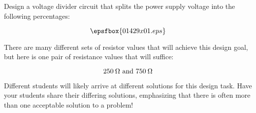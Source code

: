 

Design a voltage divider circuit that splits the power supply voltage into the following percentages:

$$\epsfbox{01429x01.eps}$$







There are many different sets of resistor values that will achieve this design goal, but here is one pair of resistance values that will suffice:

$$250 \> \Omega \hbox{ and } 750 \> \Omega$$







Different students will likely arrive at different solutions for this design task.  Have your students share their differing solutions, emphasizing that there is often more than one acceptable solution to a problem!




